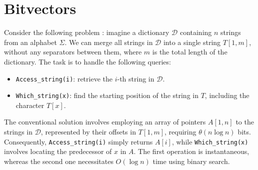\section{Bitvectors} \label{sec:bitvectors}
Consider the following problem \cite{ferragina2023pearls}: imagine a dictionary $\mathcal{D}$ containing $n$ strings from an alphabet $\Sigma$. We can merge all strings in $\mathcal{D}$ into a single string $T[1,m]$, without any separators between them, where $m$ is the total length of the dictionary. The task is to handle the following queries:
    \begin{itemize}
    \item \texttt{Access\_string(i)}: retrieve the $i$-th string in $\mathcal{D}$.
    \item \texttt{Which\_string(x)}: find the starting position of the string in $T$, including the character $T[x]$.
\end{itemize}
The conventional solution involves employing an array of pointers $A[1, n]$ to the strings in $\mathcal{D}$, represented by their offsets in $T[1, m]$, requiring $\theta(n \log n)$ bits. Consequently, \texttt{Access\_string(i)} simply returns $A[i]$, while \texttt{Which\_string(x)} involves locating the predecessor of $x$ in $A$. The first operation is instantaneous, whereas the second one necessitates $O(\log n)$ time using binary search. \vspace{0.4cm}

